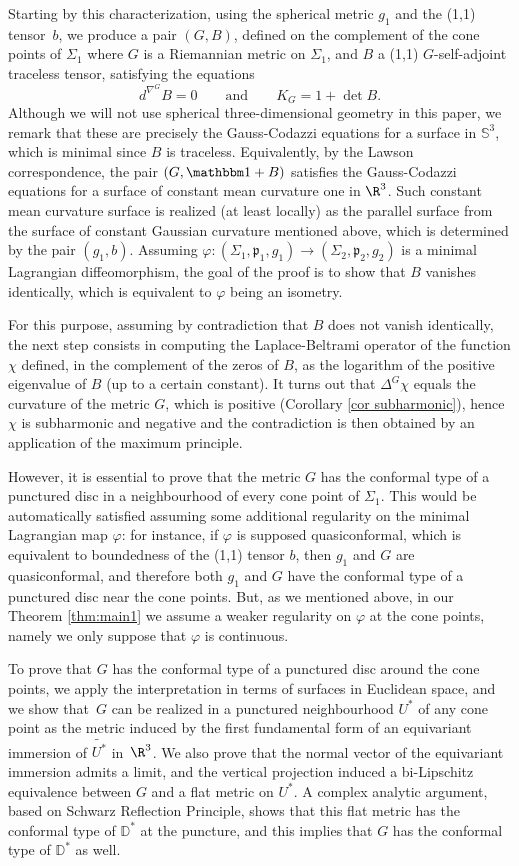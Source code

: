Starting by this characterization, using the spherical metric $g_1$ and the (1,1) tensor~$b$, we produce a pair $(G,B)$, {defined on the complement of the cone points of $\Sigma_1$} where $G$ is a Riemannian metric on $\Sigma_1$, and $B$ a (1,1) $G$-self-adjoint traceless tensor, satisfying the equations
\[
d^{\nabla^G}\!\!B=0\qquad\text{and}\qquad K_G=1+\det B.
\]
Although we will not use spherical three-dimensional geometry in this paper, we remark that these are precisely the Gauss-Codazzi equations for a surface in $\mathbb S^3$, which is minimal since $B$ is traceless. Equivalently, by the Lawson correspondence, the pair $(G,\mathbbm 1+B)$ satisfies the Gauss-Codazzi equations for a surface of constant mean curvature one in $\R^3$. Such constant mean curvature surface is realized (at least locally) as the parallel surface from the surface of constant Gaussian curvature mentioned above, which is determined by the pair $(g_1,b)$.
Assuming $\varphi:(\Sigma_1,\mathfrak p_1,g_1)\to(\Sigma_2,\mathfrak p_2,g_2)$ is a minimal Lagrangian diffeomorphism, the goal of the proof is to show that $B$ vanishes identically, which is equivalent to $\varphi$ being an isometry.

For this purpose, assuming by contradiction that $B$ does not vanish identically, the next step consists in computing the Laplace-Beltrami operator of the function $\chi$ defined, in the complement of the zeros of $B$, as the logarithm of the positive eigenvalue of $B$ (up to a certain constant). It turns out that $\Delta^G\chi$ equals the curvature of the metric $G$, which is positive (Corollary \ref{cor subharmonic}), hence $\chi$ is subharmonic and negative and the contradiction is then obtained by an application of the maximum principle.

However, it is essential to prove that the metric $G$ has the conformal type of a punctured disc in a neighbourhood of every cone point of $\Sigma_1$. This would be automatically satisfied assuming some additional regularity on the minimal Lagrangian map $\varphi$: for instance, if $\varphi$ is supposed quasiconformal, which is equivalent to boundedness of the (1,1) tensor $b$, then $g_1$ and $G$ are quasiconformal, and therefore both $g_1$ and $G$ have the conformal type of a punctured disc near the cone points.
But, as we mentioned above, in our Theorem \ref{thm:main1} we assume a weaker regularity on $\varphi$ at the cone points, namely we only suppose that $\varphi$ is continuous.

To prove that $G$ has the conformal type of a punctured disc around the cone points, we apply the interpretation in terms of surfaces in Euclidean space, and we show that~$G$ can be realized in a punctured neighbourhood $U^*$ of any cone point as the metric induced by the first fundamental form of an equivariant immersion of $\widetilde{U^*}$ in~$\R^3$. We also prove that the normal vector of the equivariant immersion admits a limit, and the vertical projection induced a bi-Lipschitz equivalence between $G$ and a flat metric on $U^*$. A complex analytic argument, based on Schwarz Reflection Principle, shows that this flat metric has the conformal type of $\mathbb D^*$ at the puncture, and this implies that $G$ has the conformal type of $\mathbb D^*$ as well.

